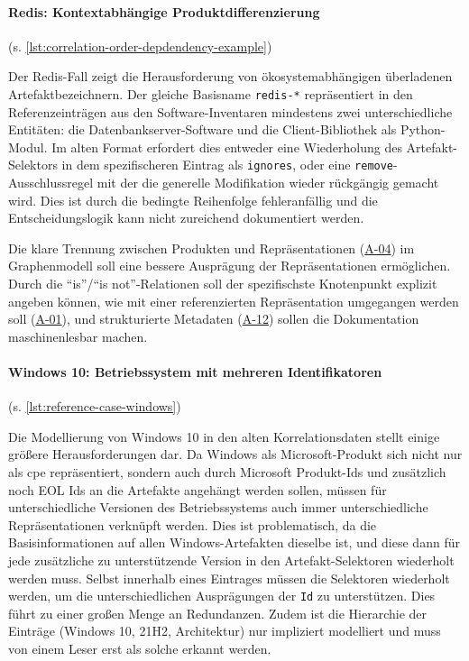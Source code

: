 \paragraph{Redis: Kontextabhängige Produktdifferenzierung}\label{par:reference-case-redis} (s. \autoref{lst:correlation-order-depdendency-example})

Der Redis-Fall zeigt die Herausforderung von ökosystemabhängigen überladenen Artefaktbezeichnern.
Der gleiche Basisname \texttt{redis-*} repräsentiert in den Referenzeinträgen aus den Software-Inventaren mindestens zwei unterschiedliche Entitäten: die Datenbankserver-Software und die Client-Bibliothek als Python-Modul.
Im alten Format erfordert dies entweder eine Wiederholung des Artefakt-Selektors in dem spezifischeren Eintrag als \texttt{ignores}, oder eine \texttt{remove}-Ausschlussregel mit der die generelle Modifikation wieder rückgängig gemacht wird.
Dies ist durch die bedingte Reihenfolge fehleranfällig und die Entscheidungslogik kann nicht zureichend dokumentiert werden.

Die klare Trennung zwischen Produkten und Repräsentationen (\hyperref[subsec:req-product-concept]{A-04}) im Graphenmodell soll eine bessere Ausprägung der Repräsentationen ermöglichen.
Durch die \enquote{is}/\enquote{is not}-Relationen soll der spezifischste Knotenpunkt explizit angeben können, wie mit einer referenzierten Repräsentation umgegangen werden soll (\hyperref[subsec:req-format-product-graph]{A-01}), und strukturierte Metadaten (\hyperref[subsec:req-reason-format]{A-12}) sollen die Dokumentation maschinenlesbar machen.

\paragraph{Windows 10: Betriebssystem mit mehreren Identifikatoren}\label{par:reference-case-windows} (s. \autoref{lst:reference-case-windows})

Die Modellierung von Windows 10 in den alten Korrelationsdaten stellt einige größere Herausforderungen dar.
Da Windows als Microsoft-Produkt sich nicht nur als \acrshort{cpe} repräsentiert, sondern auch durch Microsoft Produkt-Ids und zusätzlich noch EOL Ids an die Artefakte angehängt werden sollen, müssen für unterschiedliche Versionen des Betriebssystems auch immer unterschiedliche Repräsentationen verknüpft werden.
Dies ist problematisch, da die Basisinformationen auf allen Windows-Artefakten dieselbe ist, und diese dann für jede zusätzliche zu unterstützende Version in den Artefakt-Selektoren wiederholt werden muss.
Selbst innerhalb eines Eintrages müssen die Selektoren wiederholt werden, um die unterschiedlichen Ausprägungen der \texttt{Id} zu unterstützen.
Dies führt zu einer großen Menge an Redundanzen.
Zudem ist die Hierarchie der Einträge (Windows 10, 21H2, Architektur) nur impliziert modelliert und muss von einem Leser erst als solche erkannt werden.

